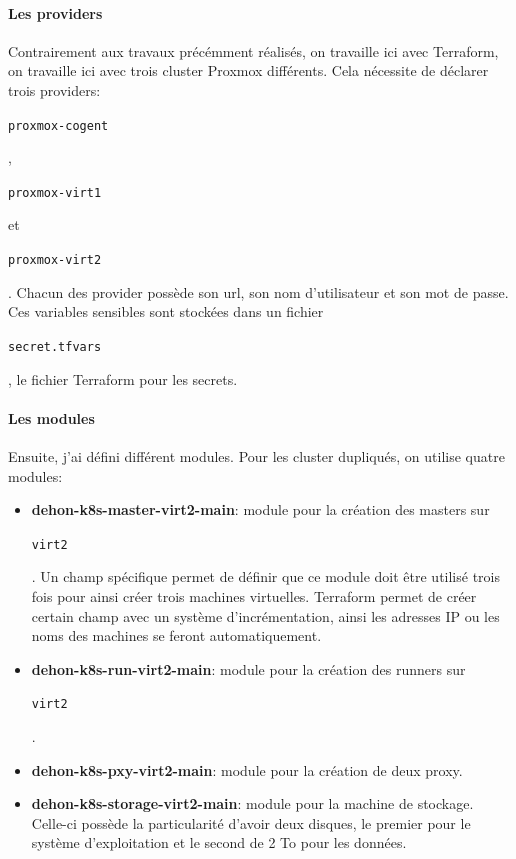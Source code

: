 \documentclass[12pt]{article}
\begin{document}
\paragraph{Les providers}
Contrairement aux travaux précémment réalisés, on travaille ici avec Terraform, on travaille ici avec trois \gls{cluster} \gls{Proxmox} différents.
Cela nécessite de déclarer trois providers: \begin{code}\texttt{proxmox-cogent}\end{code},\begin{code}\texttt{proxmox-virt1}\end{code} et\begin{code}\texttt{proxmox-virt2}\end{code}.
Chacun des provider possède son url, son nom d'utilisateur et son mot de passe.
Ces variables sensibles sont stockées dans un fichier \begin{code}\texttt{secret.tfvars}\end{code}, le fichier Terraform pour les secrets.

\paragraph{Les modules}
Ensuite, j'ai défini différent modules. Pour les \gls{cluster} dupliqués, on utilise quatre modules:
\begin{itemize}
    \item \textbf{dehon-k8s-master-virt2-main}: module pour la création des masters sur \begin{code}\texttt{virt2}\end{code}.
    Un champ spécifique permet de définir que ce module doit être utilisé trois fois pour ainsi créer trois machines virtuelles.
    Terraform permet de créer certain champ avec un système d'incrémentation, ainsi les adresses \gls{IP} ou les noms des machines se feront automatiquement.
    \item \textbf{dehon-k8s-run-virt2-main}: module pour la création des runners sur \begin{code}\texttt{virt2}\end{code}.
    \item \textbf{dehon-k8s-pxy-virt2-main}: module pour la création de deux proxy.
    \item \textbf{dehon-k8s-storage-virt2-main}: module pour la machine de stockage.
    Celle-ci possède la particularité d'avoir deux disques, le premier pour le système d'exploitation et le second de 2 To pour les données.
\end{itemize}
\end{document}
